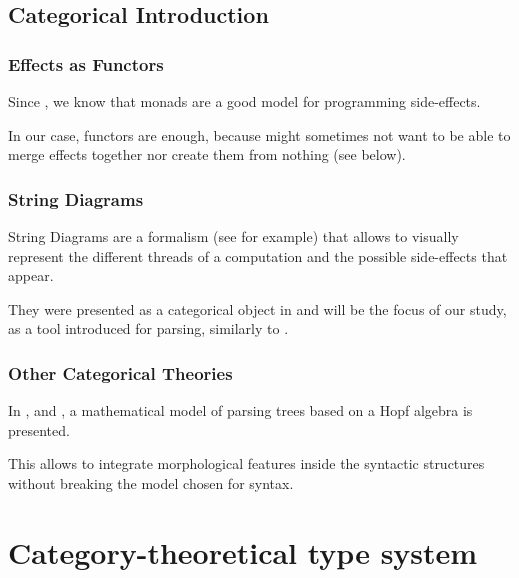 \documentclass[math, english, info]{beamercours}
\begin{document}
\subsection{Categorical Introduction}
\begin{frame}
	\frametitle{Effects as Functors}
	Since \cite{moggiComputationalLambdacalculusMonads1989}, we know that monads
	are a good model for programming side-effects.

	\pause

	\medskip

	In our case, functors are enough, because might sometimes not want to be able
	to merge effects together nor create them from nothing (see below).
\end{frame}

\begin{frame}
	\frametitle{String Diagrams}
	String Diagrams are a formalism (see \cite{hinzeIntroducingStringDiagrams2023}
	for example) that allows to visually represent the different threads of a
	computation and the possible side-effects that appear.

	\pause

	\medskip

	They were presented as a categorical object in
	\cite{joyalGeometryTensorCalculus1991} and will be the focus of our study, as
	a tool introduced for parsing, similarly to
	\cite{coeckeMathematicalFoundationsCompositional2010}.
\end{frame}

\begin{frame}
	\frametitle{Other Categorical Theories}
	In \cite{marcollimatildeetchomskynoametberwickrobertc.MathematicalStructureSyntactic},
	and \cite{senturiaAlgebraicStructureMorphosyntax2025}, a mathematical model
	of parsing trees based on a Hopf algebra is presented.

	\medskip

	This allows to integrate morphological features inside the syntactic
	structures without breaking the model chosen for syntax.
\end{frame}

\section{Category-theoretical type system}
\end{document}
